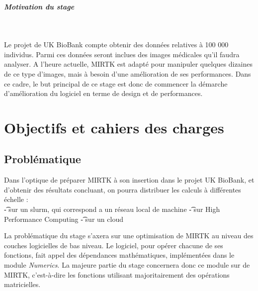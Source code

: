 \documentclass[10pt]{report}
\begin{document}
	 \paragraph{Motivation du stage}~\par
	 Le projet de UK BioBank compte obtenir des données relatives à 100 000 individus. Parmi ces données seront inclues des images médicales qu'il faudra analyser. A l'heure actuelle, MIRTK est adapté pour manipuler quelques dizaines de ce type d'images, mais à besoin d'une amélioration de ses performances. Dans ce cadre, le but principal de ce stage est donc de commencer la démarche d'amélioration du logiciel en terme de design et de performances.
\chapter{Objectifs et cahiers des charges}
	\section{Problématique} %
%	
	Dans l'optique de préparer MIRTK à son insertion dans le projet UK BioBank, et d'obtenir des résultats concluant, on pourra distribuer les calculs à différentes échelle : \\
	\t - sur un slurm, qui correspond a un réseau local de machine
	\t - sur High Performance Computing
	\t - sur un cloud 	
	
	La problématique du stage s'axera sur une optimisation de MIRTK au niveau des couches logicielles de bas niveau. Le logiciel, pour opérer chacune de ses fonctions, fait appel des dépendances mathématiques, implémentées dans le module \textit{Numerics}. La majeure partie du stage concernera donc ce module sur de MIRTK, c'est-à-dire les fonctions utilisant majoritairement des opérations matricielles.\\
	
\end{document}
